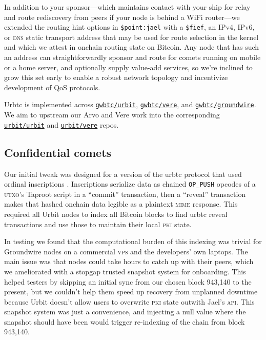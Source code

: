 \documentclass[twoside]{article}
\begin{document}
In addition to your sponsor---which maintains contact with
your ship for relay and route rediscovery from peers if your node is
behind a WiFi router---we extended the routing hint options in
\texttt{\$point:jael} with a \texttt{\$fief}, an IPv4, IPv6, or \textsc{dns}
static transport address that may be used for route selection in the
kernel and which we attest in onchain routing state on Bitcoin. Any node
that has such an address can straightforwardly sponsor and route for
comets running on mobile or a home server, and optionally supply
value-add services, so we're inclined to grow this set early to enable a
robust network topology and incentivize development of QoS protocols.

Urbtc is implemented across \href{https://github.com/gwbtc/urbit}{\texttt{gwbtc/urbit}}, \href{https://github.com/gwbtc/vere}{\texttt{gwbtc/vere}},
and \href{https://github.com/gwbtc/groundwire}{\texttt{gwbtc/groundwire}}. We aim to upstream our Arvo and Vere work
into the corresponding \href{https://github.com/urbit/urbit}{\texttt{urbit/urbit}} and \href{https://github.com/urbit/vere}{\texttt{urbit/vere}}
repos.

\subsection{Confidential comets}\label{confidential-comets}

Our initial tweak was designed for a version of the urbtc protocol that
used ordinal inscriptions \citep{Rodarmor2026Inscriptions}. Inscriptions
serialize data as chained \texttt{OP\_PUSH} opcodes of a \textsc{utxo}'s Taproot
script in a ``commit'' transaction, then a ``reveal'' transaction makes
that hashed onchain data legible as a plaintext \textsc{mime} response. This
required all Urbit nodes to index all Bitcoin blocks to find urbtc reveal
transactions and use those to maintain their local \textsc{pki} state.

In testing we found that the computational burden of this indexing was
trivial for Groundwire nodes on a commercial \textsc{vps} and the developers' own
laptops. The main issue was that nodes could take hours to catch up with
their peers, which we ameliorated with a stopgap trusted snapshot system
for onboarding. This helped testers by skipping an initial sync from our
chosen block 943,140 to the present, but we couldn't help them speed up
recovery from unplanned downtime because Urbit doesn't allow users to
overwrite \textsc{pki} state outwith Jael's \textsc{api}. This snapshot system was just a convenience, and
injecting a null value where the snapshot should have been would trigger
re-indexing of the chain from block 943,140.
\end{document}
